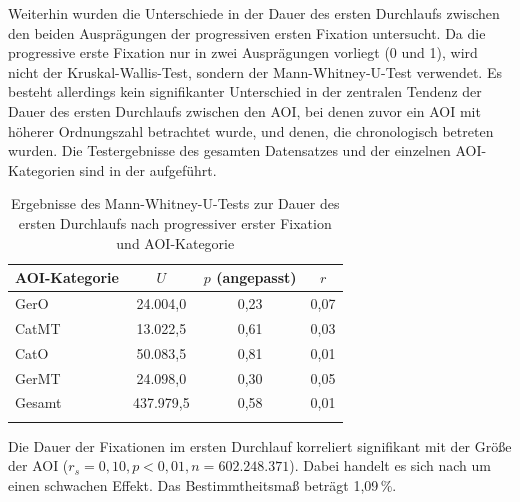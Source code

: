 
Weiterhin wurden die Unterschiede in der Dauer des ersten Durchlaufs zwischen den beiden Ausprägungen der progressiven ersten Fixation untersucht. Da die progressive erste Fixation nur in zwei Ausprägungen vorliegt (0 und 1), wird nicht der Kruskal-Wallis-Test, sondern der Mann-Whitney-U-Test verwendet. Es besteht allerdings kein signifikanter Unterschied in der zentralen Tendenz der Dauer des ersten Durchlaufs zwischen den AOI, bei denen zuvor ein AOI mit höherer Ordnungszahl betrachtet wurde, und denen, die chronologisch betreten wurden. Die Testergebnisse des gesamten Datensatzes und der einzelnen AOI-Kategorien sind in der  aufgeführt.



\begin{table}	
    \begin{tabular}{lccc}  
    \lsptoprule
        {AOI-Kategorie} & {$U$} & {$p$ (angepasst)} & {$r$}\\ 
        \midrule
        GerO &  24.004,0 & 0,23 & 0,07 \\
        CatMT & 13.022,5 & 0,61 & 0,03\\
        CatO & 50.083,5 & 0,81 & 0,01 \\
        GerMT & 24.098,0 & 0,30 & 0,05 \\
        \midrule
        Gesamt & 437.979,5 & 0,58 & 0,01 \\
        \lspbottomrule
        
    \end{tabular}
        \caption[Ergebnisse des Mann-Whitney-U-Tests zur Dauer des ersten Durchlaufs]{Ergebnisse des Mann-Whitney-U-Tests zur Dauer des ersten Durchlaufs nach progressiver erster Fixation und AOI-Kategorie}
    \label{K6:tab:CatDe:mwu-ffixpro-iafrd}
\end{table}


Die Dauer der Fixationen im ersten Durchlauf korreliert signifikant mit der Größe der AOI ($r_{s} = 0,10, p < 0,01, n = 602.248.371$). Dabei handelt es sich nach \citet{cohen_power_1992} um einen schwachen Effekt. Das Bestimmtheitsmaß beträgt 1,09\,\%.



